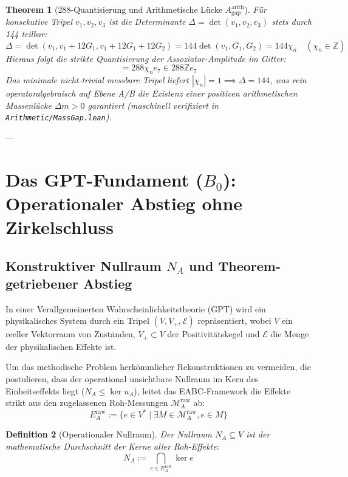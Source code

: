\documentclass[11pt,a4paper]{article}
\newtheorem{theorem}{Theorem}[section]
\newtheorem{definition}[theorem]{Definition}
\begin{document}
\begin{theorem}[288-Quantisierung und Arithmetische Lücke $A_{\text{gap}}^{\text{arith}}$]
Für konsekutive Tripel $v_1, v_2, v_3$ ist die Determinante $\Delta = \det(v_1, v_2, v_3)$ stets durch 144 teilbar:
\begin{equation}
\Delta = \det(v_1, v_1 + 12G_1, v_1 + 12G_1 + 12G_2) = 144 \det(v_1, G_1, G_2) = 144 \chi_n \quad (\chi_n \in \mathbb{Z})
\end{equation}
Hieraus folgt die strikte Quantisierung der Assoziator-Amplitude im Gitter:
\begin{equation}
[X_n, X_{n+1}, X_{n+2}] = 288 \chi_n e_7 \in 288\mathbb{Z}e_7
\end{equation}
Das minimale nicht-trivial messbare Tripel liefert $|\chi_n|=1 \implies \Delta = 144$, was rein operatoralgebraisch auf Ebene A/B die Existenz einer positiven arithmetischen Massenlücke $\Delta m > 0$ garantiert (maschinell verifiziert in \texttt{Arithmetic/MassGap.lean}).
\end{theorem}

---

\section{Das GPT-Fundament ($B_0$): Operationaler Abstieg ohne Zirkelschluss}

\subsection{Konstruktiver Nullraum $N_A$ und Theorem-getriebener Abstieg}

In einer Verallgemeinerten Wahrscheinlichkeitstheorie (GPT) wird ein physikalisches System durch ein Tripel $(V, V_+, \mathcal{E})$ repräsentiert, wobei $V$ ein reeller Vektorraum von Zuständen, $V_+ \subset V$ der Positivitätskegel und $\mathcal{E}$ die Menge der physikalischen Effekte ist.

Um das methodische Problem herkömmlicher Rekonstruktionen zu vermeiden, die postulieren, dass der operational unsichtbare Nullraum im Kern des Einheitseffekts liegt ($N_A \le \ker u_A$), leitet das EABC-Framework die Effekte strikt aus den zugelassenen Roh-Messungen $\mathcal{M}_A^{\text{raw}}$ ab:
\begin{equation}
E_A^{\text{raw}} := \{e \in V^* \mid \exists M \in \mathcal{M}_A^{\text{raw}}, e \in M\}
\end{equation}

\begin{definition}[Operationaler Nullraum]
Der Nullraum $N_A \subseteq V$ ist der mathematische Durchschnitt der Kerne aller Roh-Effekte:
\begin{equation}
N_A := \bigcap_{e \in E_A^{\text{raw}}} \ker e
\end{equation}
\end{definition}
\end{document}
